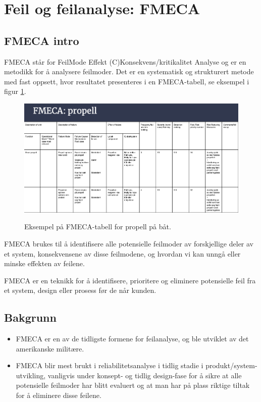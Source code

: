 \section{Feil og feilanalyse: FMECA}
\label{sec:fmeca}


\subsection{FMECA intro}

FMECA står for FeilMode Effekt (C)Konsekvens/kritikalitet Analyse og er en metodikk for å analysere feilmoder. Det er en systematisk og strukturert metode med fast oppsett, hvor resultatet presenteres i en FMECA-tabell, se eksempel i figur \ref{fig:fmeca_propell}.

\begin{figure}[H]
    \centering
        \includegraphics[width=\textwidth]{figures/FMECA/Skjermbilde 2021-11-24 kl. 09.54.55.png}\\
        \caption{Eksempel på FMECA-tabell for propell på båt.}
        \label{fig:fmeca_propell}
\end{figure}

FMECA brukes til å identifisere alle potensielle feilmoder av forskjellige deler av et system, konsekvensene av disse feilmodene, og hvordan vi kan unngå eller minske effekten av feilene.

FMECA er en teknikk for å identifisere, prioritere og eliminere potensielle feil fra et system, design eller prosess før de når kunden.

\subsection{Bakgrunn}
\begin{itemize}
    \item FMECA er en av de tidligste formene for feilanalyse, og ble utviklet av det amerikanske militære.
    \item FMECA blir mest brukt i reliabilitetsanalyse i tidlig stadie i produkt/system-utvikling, vanligvis under konsept- og tidlig design-fase for å sikre at alle potensielle feilmoder har blitt evaluert og at man har på plass riktige tiltak for å eliminere disse feilene.
\end{itemize}

